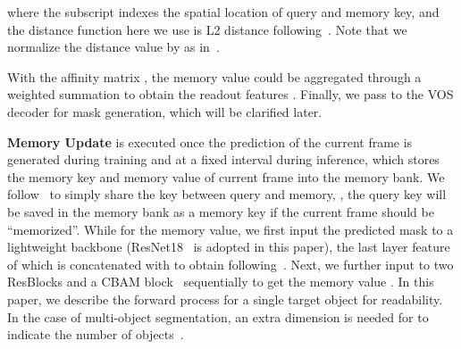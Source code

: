 \documentclass[10pt,twocolumn,letterpaper]{article}
\begin{document}
where the subscript indexes the spatial location of query and memory key, and the distance function here we use is L2 distance following~\cite{cheng2021stcn,cheng2022xmem}. Note that we normalize the distance value by  as in~\cite{oh2019video,cheng2021stcn}.

With the affinity matrix , the memory value  could be aggregated through a weighted summation to obtain the readout features . Finally, we pass  to the VOS decoder for mask generation, which will be clarified later.

\vspace{0.02in}
\noindent \textbf{Memory Update} is executed once the prediction of the current frame is generated  during training and at a fixed interval during inference, which stores the memory key and memory value of current frame into the memory bank. We follow~\cite{cheng2021stcn,cheng2022xmem} to simply share the key between query and memory, \ie, the query key will be saved in the memory bank as a memory key if the current frame should be ``memorized''. While for the memory value, we first input the predicted mask to a lightweight backbone (ResNet18~\cite{he2016deep} is adopted in this paper), the last layer feature of which is concatenated with  to obtain  following~\cite{cheng2021stcn,cheng2022xmem}. Next, we further input  to two ResBlocks and a CBAM block~\cite{woo2018cbam} sequentially to get the memory value . In this paper, we describe the forward process for a single target object for readability. In the case of multi-object segmentation, an extra dimension is needed for  to indicate the number of objects~\cite{cheng2021stcn}.
\end{document}
